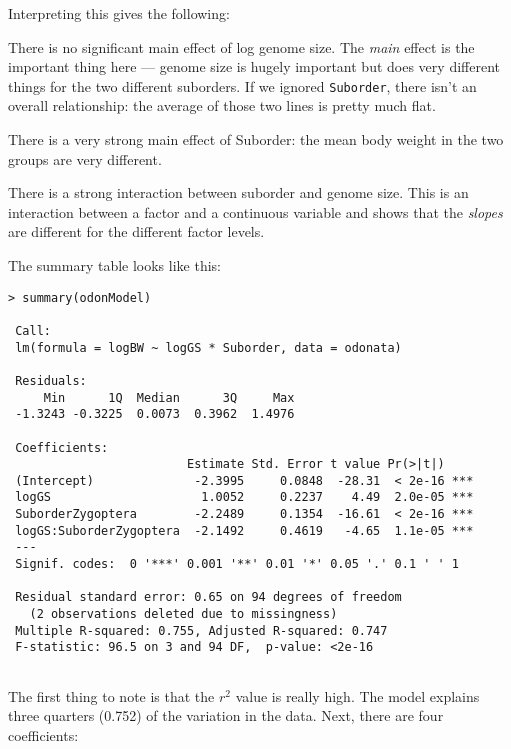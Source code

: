 Interpreting this gives the following:
\begin{compactitem}

	\item There is no significant main effect of log genome size. The 
	{\it main} effect is the important thing here --- genome size is 
	hugely important but does very different things for the two different 
	suborders. If we ignored {\tt Suborder}, there isn't an overall 
	relationship: the average of those two lines is pretty much flat.

	\item There is a very strong main effect of Suborder: the mean body 
	weight in the two groups are very different.

	\item There is a strong interaction between suborder and genome size. 
	This is an interaction between a factor and a continuous variable and 
	shows that the {\it slopes} are different for the different factor 
	levels.

\end{compactitem}
	
The summary table looks like this:
\begin{lstlisting}
> summary(odonModel)
 
 Call:
 lm(formula = logBW ~ logGS * Suborder, data = odonata)
 
 Residuals:
     Min      1Q  Median      3Q     Max 
 -1.3243 -0.3225  0.0073  0.3962  1.4976 
 
 Coefficients:
                         Estimate Std. Error t value Pr(>|t|)    
 (Intercept)              -2.3995     0.0848  -28.31  < 2e-16 ***
 logGS                     1.0052     0.2237    4.49  2.0e-05 ***
 SuborderZygoptera        -2.2489     0.1354  -16.61  < 2e-16 ***
 logGS:SuborderZygoptera  -2.1492     0.4619   -4.65  1.1e-05 ***
 ---
 Signif. codes:  0 '***' 0.001 '**' 0.01 '*' 0.05 '.' 0.1 ' ' 1 
 
 Residual standard error: 0.65 on 94 degrees of freedom
   (2 observations deleted due to missingness)
 Multiple R-squared: 0.755,	Adjusted R-squared: 0.747 
 F-statistic: 96.5 on 3 and 94 DF,  p-value: <2e-16 
 
\end{lstlisting}

The first thing to note is that the $r^2$ value is really high. The 
model explains three quarters (0.752) of the variation in the data. 
Next, there are four coefficients:

